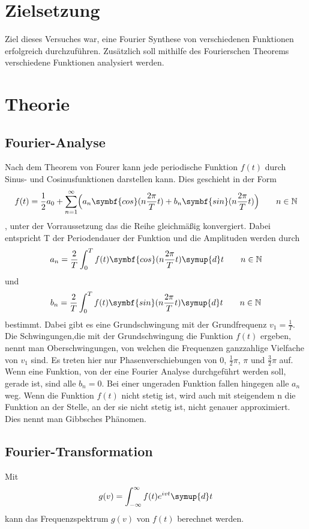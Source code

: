 \section{Zielsetzung}
\label{sec:Zielsetzung}
Ziel dieses Versuches war, eine Fourier Synthese von verschiedenen Funktionen erfolgreich durchzuführen.
Zusätzlich soll mithilfe des Fourierschen Theorems verschiedene Funktionen analysiert werden.

\section{Theorie}
\label{sec:Theorie}
\subsection{Fourier-Analyse}
Nach dem Theorem von Fourer kann jede periodische Funktion $f(t)$ durch Sinus- und Cosinusfunktionen darstellen kann.
Dies geschieht in der Form 
\begin{equation}
    f(t)=\frac{1}{2}a_0+\sum_{n=1}^{\infty}\Bigl(a_n \symbf{cos}(n \frac{2 \pi}{T} t) + b_n \symbf{sin}(n \frac{2\pi}{T}t)\Bigr) \qquad n\in\mathbb{N}
    \label{eqn:f_reihe}
\end{equation}, unter der Vorraussetzung das die Reihe gleichmäßig konvergiert.
Dabei entspricht T der Periodendauer der Funktion und die Amplituden werden durch
\begin{equation}
    a_n=\frac{2}{T}\int_0^T f(t) \symbf{cos}(n \frac{2\pi}{T}t) \symup{d}t \qquad n\in\mathbb{N}
    \label{eqn:a_n}
\end{equation}
und 
\begin{equation}
    b_n=\frac{2}{T}\int_0^T f(t) \symbf{sin}(n \frac{2\pi}{T}t) \symup{d}t \qquad n\in\mathbb{N}
    \label{eqn:b_n}
\end{equation}
bestimmt.
Dabei gibt es eine Grundschwingung mit der Grundfrequenz $v_1=\frac{1}{T}$.
Die Schwingungen,die mit der Grundschwingung die Funktion $f(t)$ ergeben, nennt man Oberschwingungen, von welchen die Frequenzen ganzzahlige Vielfache von $v_1$ sind.
Es treten hier nur Phasenverschiebungen von 0, $\frac{1}{2}\pi$, $\pi$ und $\frac{3}{2}\pi$ auf.
Wenn eine Funktion, von der eine Fourier Analyse durchgeführt werden soll, gerade ist, sind alle $b_n=0$.
Bei einer ungeraden Funktion fallen hingegen alle $a_n$ weg.
Wenn die Funktion $f(t)$ nicht stetig ist, wird auch mit steigendem n die Funktion an der Stelle, an der sie nicht stetig ist, nicht genauer approximiert.
Dies nennt man Gibbsches Phänomen.

\subsection{Fourier-Transformation}
Mit
\begin{equation}
    g(v)=\int_{-\infty}^{\infty} f(t) e^{ivt} \symup{d}t
    \label{eqn:trafo}
\end{equation}
kann das Frequenzspektrum $g(v)$ von $f(t)$ berechnet werden.%
\cite{V351}
